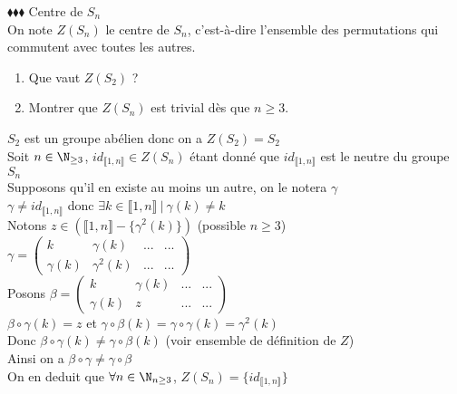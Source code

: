 \documentclass[11pt]{article}
\begin{document}
\begin{exercice}{$\blacklozenge\blacklozenge\blacklozenge$}{}
    Centre de $S_{n}$\\
    On note $Z(S_{n})$ le centre de $S_{n}$, c'est-à-dire l'ensemble des permutations qui commutent avec toutes les autres.
    \begin{enumerate}
        \item Que vaut $Z(S_{2})$ ?
        \item Montrer que $Z(S_{n})$ est trivial dès que $n \geq 3$.
    \end{enumerate}
    \tcblower
     $S_{2}$ est un groupe abélien donc on a $Z(S_{2}) = S_{2}$\\
     Soit $n \in \N_{\geq 3}$, $id_{\llbracket 1, n \rrbracket} \in Z(S_{n})$ étant donné que $id_{\llbracket 1, n \rrbracket}$ est le neutre du groupe $S_{n}$\\
    Supposons qu'il en existe au moins un autre, on le notera $\gamma$\\
    $\gamma \neq id_{\llbracket 1, n \rrbracket}$ donc $\exists k \in \llbracket 1, n \rrbracket ~|~ \gamma(k) \neq k$\\
    Notons $z \in (\llbracket 1, n \rrbracket - \{\gamma^{2}(k)\})$ (possible $n \geq 3$) \\
    $\gamma = \begin{pmatrix}
        k & \gamma(k) & ... & ... \\
        \gamma(k) & \gamma^{2}(k) & ... & ...
    \end{pmatrix}$\\
    Posons $\beta = \begin{pmatrix}
        k & \gamma(k) & ... & ... \\
        \gamma(k) & z & ... & ...
    \end{pmatrix}$\\
    $\beta \circ \gamma(k) = z$ et $\gamma \circ \beta(k) = \gamma \circ \gamma(k) = \gamma^{2}(k)$\\
    Donc $\beta \circ \gamma(k) \neq \gamma \circ \beta(k)$ (voir ensemble de définition de $Z$)\\
    Ainsi on a $\beta \circ \gamma \neq \gamma \circ \beta$\\
    On en deduit que $\forall n \in \N_{n\geq 3}$, $Z(S_{n}) = \{ id_{\llbracket 1, n \rrbracket} \}$
\end{exercice}
\end{document}
